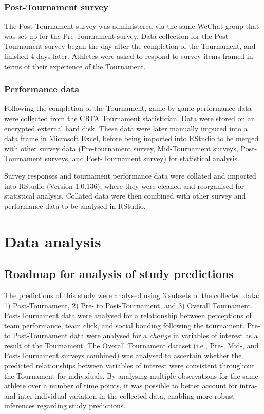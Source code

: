 \begin{CJK}{UTF8}{gbsn}
\subsubsection{Post-Tournament survey}
The Post-Tournament survey was administered via the same WeChat group that was set up for the Pre-Tournament survey. Data collection for the Post-Tournament survey began the day after the completion of the Tournament, and finished 4 days later. Athletes were asked to respond to survey items framed in terms of their experience of the Tournament.

\subsubsection{Performance data}
Following the completion of the Tournament, game-by-game performance data were collected from the CRFA Tournament statistician.  Data were stored on an encrypted external hard disk. These data were later manually imputed into a data frame in Microsoft Excel, before being imported into RStudio to be merged with other survey data (Pre-tournament survey, Mid-Tournament surveys, Post-Tournament surveys, and Post-Tournament survey) for statistical analysis.

Survey responses and tournament performance data were collated and imported into RStudio (Version 1.0.136), where they were cleaned and reorganised for statistical analysis. Collated data were then combined with other survey and performance data to be analysed in RStudio.






\clearpage
\section{Data analysis}

\subsection{Roadmap for analysis of study predictions}
The predictions of this study were analysed using 3 subsets of the collected data: 1) Post-Tournament, 2) Pre- to Post-Tournament, and 3) Overall Tournament.  Post-Tournament data were analysed for a relationship between perceptions of team performance, team click, and social bonding following the tournament.  Pre- to Post-Tournament data were analysed for a \textit{change} in variables of interest as a result of the Tournament.  The Overall Tournament dataset (i.e., Pre-, Mid-, and Post-Tournament surveys combined) was analysed to ascertain whether the predicted relationships between variables of interest were consistent throughout the Tournament for individuals.  By analysing multiple observations for the same athlete over a number of time points, it was possible to better account for intra- and inter-individual variation in the collected data, enabling more robust inferences regarding study predictions.


\end{CJK}

